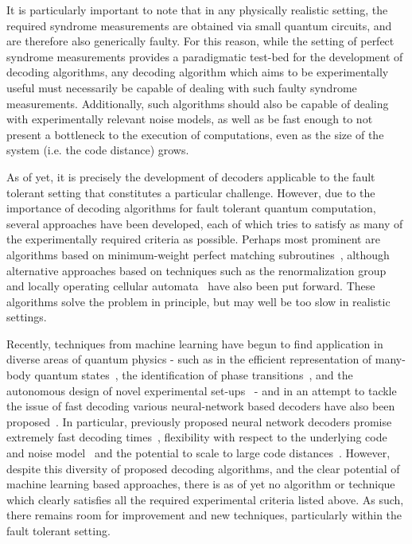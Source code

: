 \documentclass[twocolumn,preprintnumbers,amsmath,amssymb,notitlepage,nofootinbib,longbibliography,superscriptaddress,aps,pra,10pt]{revtex4-1}
\begin{document}
	It is particularly important to note that in any physically realistic setting, the required syndrome measurements are obtained via small quantum circuits, and are therefore also generically faulty.
	For this reason, while the setting of perfect syndrome measurements provides a paradigmatic test-bed for the development of decoding algorithms, any decoding algorithm which aims to be experimentally useful 
	must necessarily be capable of dealing with such faulty syndrome measurements.
	Additionally, such algorithms should also be capable of dealing with experimentally relevant noise models, as well as be fast enough to not present a bottleneck to the execution of computations, even as the size of the system (i.e. the code distance) grows.

	As of yet, it is precisely the development of decoders applicable to the fault tolerant setting that constitutes a particular challenge.
	However, due to the importance of decoding algorithms for fault tolerant quantum computation, several approaches have been developed, each of which tries to satisfy as many of the experimentally required criteria as possible.
	Perhaps most prominent are algorithms based on minimum-weight perfect matching subroutines~\cite{Fowler13}, although alternative approaches based on techniques such as the renormalization group~\cite{Duclos2010} and locally operating cellular automata~\cite{Herold15,herold2017cellular,Kubica2018} have also been put forward.
	These algorithms solve the problem in principle, but may well be too slow in realistic settings.

	Recently, techniques from machine learning have begun to find application in diverse areas of quantum physics - such as in the efficient representation of many-body quantum states~\cite{WFcarleo2017solving,WFcarleo2018constructing,WFgao2017efficient}, the identification of phase transitions~\cite{PTvan2017learning,PTPhysRevB.97.134109,PTcarrasquilla2017machine}, and the autonomous design of novel experimental set-ups~\cite{melnikov2018active} - and in an attempt to tackle the issue of fast decoding various neural-network based decoders have also been proposed~\cite{Torlai10, Varsamopoulos17, Krastanov17, chamberland2018deep, Baireuther18a, Baireuther18b, Breuckmann18,Ni18}.
	In particular, previously proposed neural network decoders promise extremely fast decoding times~\cite{chamberland2018deep}, flexibility with respect to the underlying code and noise model~\cite{chamberland2018deep,Baireuther18a,Baireuther18b,Breuckmann18} and the potential to scale to large code distances~\cite{Ni18, Breuckmann18}.
	However, despite this diversity of proposed decoding algorithms, and the clear potential of machine learning based approaches, there is as of yet no algorithm or technique which clearly satisfies all the required experimental criteria listed above.
	As such, there remains room for improvement and new techniques, particularly within the fault tolerant setting.
\end{document}
